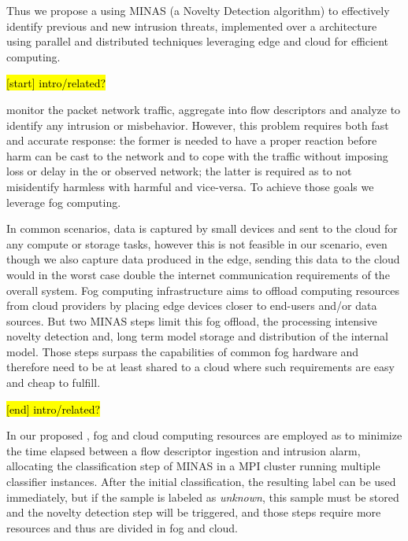 
Thus we propose a \nids using MINAS \cite{Faria2016minas} (a Novelty Detection algorithm)
to effectively identify previous and new intrusion threats,
implemented over a architecture \cite{Cassales2019a} using parallel and distributed techniques leveraging
edge and cloud for efficient computing.

\hl{[start] intro/related?}

\nids 
monitor the packet network traffic, aggregate into flow descriptors and
analyze to identify any intrusion or misbehavior.
However, this problem requires both fast and accurate response:
the former is needed to have a proper reaction before harm can be cast
to the network and to cope with the traffic without imposing loss or delay
in the \nids or observed network;
the latter is required as to not misidentify harmless with harmful and vice-versa.
To achieve those goals we leverage fog computing.


In common \iot scenarios, data is captured by small devices and sent to the
cloud for any compute or storage tasks, however this is not feasible in our
\nids scenario, even though we also capture data produced in the edge,
sending this data to the cloud would in the worst case double the
internet communication requirements of the overall system.
Fog computing infrastructure aims to offload
computing resources from cloud providers by placing edge
devices closer to end-users and/or data sources.
But two MINAS steps limit this fog offload,
the processing intensive novelty detection and,
long term model storage and distribution of the internal model.
Those steps surpass the capabilities of common fog hardware and
therefore need to be at least shared to a cloud where such
requirements are easy and cheap to fulfill.

\hl{[end] intro/related?}

In our proposed \nids, fog and cloud computing resources are
employed as to minimize the time elapsed between a flow descriptor
ingestion and intrusion alarm, allocating the 
classification step of MINAS in a MPI cluster running multiple
classifier instances.
After the initial classification, the resulting label can be used immediately,
but if the sample is labeled as \emph{unknown}, this sample must be stored
and the novelty detection step will be triggered, and those steps require more resources
and thus are divided in fog and cloud.

